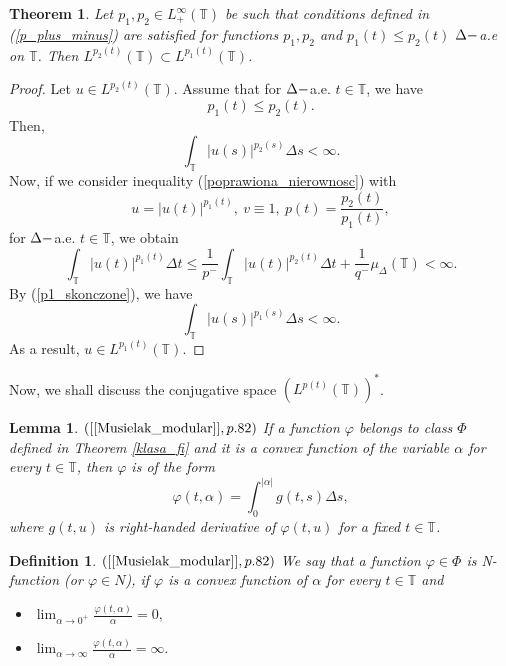 \documentclass[12pt,a4paper,oneside,titlepage]{article}
\newtheorem{Twierdzenie}{Theorem}
\newtheorem{Def}{Definition}
\newtheorem{Lemat}{Lemma}
\begin{document}
\begin{Twierdzenie}
\label{zanurzanie_;[}
 Let $p_1, p_2 \in L^{\infty}_{+}(\mathbb{T})$ be such that conditions defined in (\ref{p_plus_minus}) are satisfied for functions $p_1,p_2$ and $p_1(t) \leq p_2(t)$ $\Delta \--$a.e on $\mathbb{T}$. Then $L^{p_2(t)}(\mathbb{T}) \subset L^{p_1(t)}(\mathbb{T})$.
\end{Twierdzenie}
\begin{proof}
Let $u \in L^{p_2(t)}(\mathbb{T})$. Assume that for $\Delta \-- $a.e. $t \in \mathbb{T}$, we have
\begin{equation}
p_1(t) \leq p_2(t).
\end{equation}
Then,
\begin{equation}
\label{p1_skonczone}
 \int_{\mathbb{T}} \vert  u(s) \vert^{p_2(s)} \Delta s < \infty. 
\end{equation}
\indent
Now, if we consider inequality (\ref{poprawiona_nierownosc}) with
\begin{equation}
\nonumber
u= \vert u(t) \vert^{p_1(t)},~ v \equiv 1,~p(t) = \frac{p_2(t)}{p_1(t)},
\end{equation}
 for $ \Delta \--$a.e. $ t \in \mathbb{T}$, we obtain
\begin{equation}
\nonumber
\int_{\mathbb{T}} \vert u(t) \vert^{p_1(t)} \Delta t \leq  \frac{1}{p^-} \int_{\mathbb{T}} \vert u(t) \vert^{p_2(t)} \Delta t + \frac{1}{q^-} \mu_{\Delta}(\mathbb{T}) < \infty.
\end{equation}
By (\ref{p1_skonczone}), we have
\begin{equation}
\nonumber
 \int_{\mathbb{T}} \vert  u(s) \vert^{p_1(s)} \Delta s < \infty. 
\end{equation}
As a result, $u \in L^{p_1(t)} \left( \mathbb{T}\right)$.
\end{proof}
\bigskip
Now, we shall discuss the conjugative space $ \left( L^{p(t)} \left( \mathbb{T}\right) \right)^{*}$.
\begin{Lemat} $([\ref{Musielak_modular}], p.82)$ If a function $ \varphi$ belongs to class $\Phi$ defined in Theorem \ref{klasa_fi} and it is a convex function of the variable $\alpha$ for every $t \in \mathbb{T}$, then $\varphi$ is of the form
\begin{equation}
\label{young_1}
\varphi(t,\alpha) = \int_{0}^{\vert \alpha \vert} g(t, s) \Delta s,
\end{equation} 
where $g(t,u)$ is right-handed derivative of $\varphi(t,u)$ for a fixed $t \in \mathbb{T}$.
\end{Lemat}
\begin{Def} $([\ref{Musielak_modular}], p.82)$ We say that a function $\varphi \in \Phi$ is N-function (or $\varphi \in N$), if $\varphi$ is a convex function of $\alpha$ for every $t \in \mathbb{T}$ and 
\begin{itemize}
\item[(N1)] $\lim_{\alpha \rightarrow 0^+} \frac{\varphi(t,\alpha)}{\alpha}=0,$
\item[(N2)] $\lim_{\alpha \rightarrow \infty}\frac{\varphi(t,\alpha)}{\alpha}=\infty. $
\end{itemize} 
\end{Def}
\end{document}
